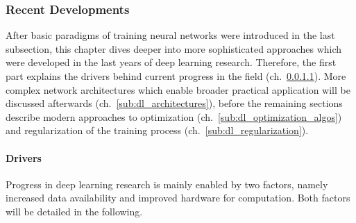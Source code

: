 \subsubsection{Recent Developments}
\label{sub:dl_developments}

After basic paradigms of training neural networks were introduced in the last
subsection, this chapter dives deeper into more sophisticated approaches
which were developed in the last years of deep learning research.
Therefore, the first part explains the drivers behind current progress in the
field (ch.~\ref{sub:dl_drivers}). More complex network architectures which enable
broader practical application will be discussed afterwards (ch.~\ref{sub:dl_architectures}),
before the remaining sections describe modern approaches to optimization
(ch.~\ref{sub:dl_optimization_algos}) and regularization of the training process
(ch.~\ref{sub:dl_regularization}).

\paragraph{Drivers}
\label{sub:dl_drivers}

Progress in deep learning research is mainly enabled by two factors, namely
increased data availability and improved hardware for computation.
Both factors will be detailed in the following.

